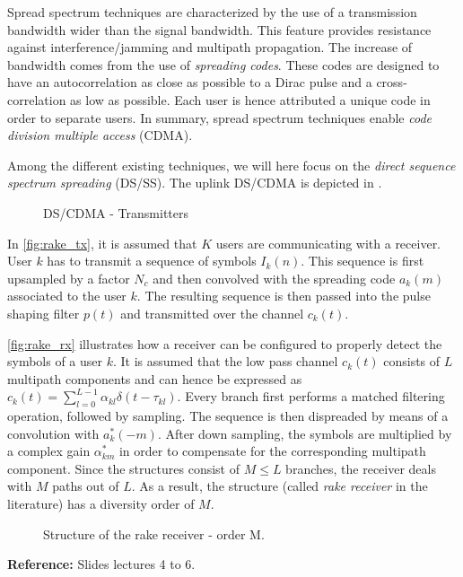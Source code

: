 \documentclass [a4paper, 11pt] {article}
\begin{document}
    \makesessiontitle
    
    \begin{reminder}

 
    Spread spectrum techniques are characterized by the use of a transmission bandwidth wider than the signal bandwidth. This feature provides resistance against interference/jamming and multipath propagation. The increase of bandwidth comes from the use of \textit{spreading codes}. These codes are designed to have an autocorrelation as close as possible to a Dirac pulse and a cross-correlation as low as possible. Each user is hence attributed a unique code in order to separate users. In summary, spread spectrum techniques enable \textit{code division multiple access} (CDMA).
 
    Among the different existing techniques, we will here focus on the \textit{direct sequence spectrum spreading} (DS/SS). The uplink DS/CDMA is depicted in .
    
    \begin{figure}[H]
        \centering
        
        \caption{DS/CDMA - Transmitters}
        \label{fig:rake_tx}
    \end{figure}
    
 
    In \autoref{fig:rake_tx}, it is assumed that $K$ users are communicating with a receiver. User $k$ has to transmit a sequence of symbols $I_k(n)$. This sequence is first upsampled by a factor $N_c$ and then convolved with the spreading code $a_k(m)$ associated to the user $k$. The resulting sequence is then passed into the pulse shaping filter $p(t)$ and transmitted over the channel $c_k(t)$.
    
 
    \autoref{fig:rake_rx} illustrates how a receiver can be configured to properly detect the symbols of a user $k$. It is assumed that the low pass channel $c_k(t)$ consists of $L$ multipath components and can hence be expressed as $c_k(t) = \sum_{l=0}^{L-1}\alpha_{kl}\delta(t-\tau_{kl})$. Every branch first performs a matched filtering operation, followed by sampling. The sequence is then dispreaded by means of a convolution with $a^*_k(-m)$. After down sampling, the symbols are multiplied by a complex gain $\alpha^*_{km}$ in order to compensate for the corresponding multipath component. Since the structures consist of $M \leq L$ branches, the receiver deals with $M$ paths out of $L$. As a result, the structure (called \textit{rake receiver} in the literature) has a diversity order of $M$.
    
    
    \begin{figure}[H]
        \centering
        
        \caption{Structure of the rake receiver - order M.}
        \label{fig:rake_rx}
    \end{figure}
    
    \vspace{0.2 cm}
 
    \textbf{Reference:} Slides lectures 4 to 6.

    \end{reminder}
    
\end{document}
